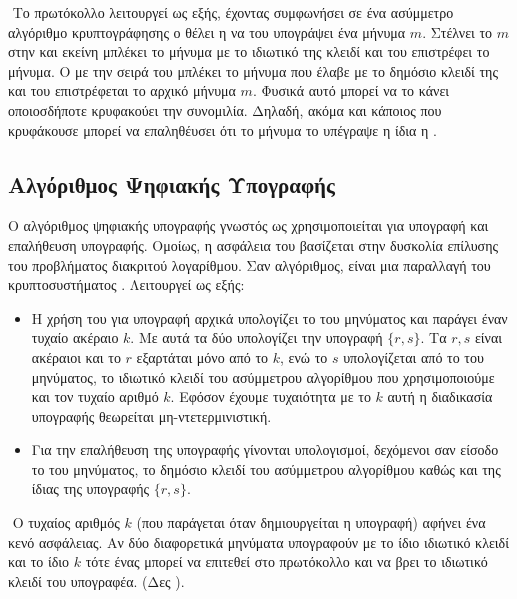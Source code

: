 \documentclass[oneside,a4paper]{article}
\begin{document}
$ $\newline
Το πρωτόκολλο λειτουργεί ως εξής, έχοντας συμφωνήσει σε ένα ασύμμετρο αλγόριθμο κρυπτογράφησης ο  θέλει η  να του υπογράψει ένα μήνυμα $m$. Στέλνει το $m$ στην  και εκείνη μπλέκει το μήνυμα με το ιδιωτικό της κλειδί και του επιστρέφει το μήνυμα. Ο  με την σειρά του μπλέκει το μήνυμα που έλαβε με το δημόσιο κλειδί της  και του επιστρέφεται το αρχικό μήνυμα $m$. Φυσικά αυτό μπορεί να το κάνει οποιοσδήποτε κρυφακούει την συνομιλία. Δηλαδή, ακόμα και κάποιος που κρυφάκουσε μπορεί να επαληθέυσει ότι το μήνυμα το υπέγραψε η ίδια η .

\subsection{Αλγόριθμος Ψηφιακής Υπογραφής}

\vspace*{0.3cm}
Ο αλγόριθμος ψηφιακής υπογραφής γνωστός ως  χρησιμοποιείται για υπογραφή και επαλήθευση υπογραφής. Ομοίως, η ασφάλεια του βασίζεται στην δυσκολία επίλυσης του προβλήματος διακριτού λογαρίθμου. Σαν αλγόριθμος, είναι μια παραλλαγή του κρυπτοσυστήματος . Λειτουργεί ως εξής:

\begin{itemize}
	\item Η χρήση του  για υπογραφή αρχικά υπολογίζει το  του μηνύματος και παράγει έναν τυχαίο ακέραιο $k$. Με αυτά τα δύο υπολογίζει την υπογραφή $\{r,s\}$. Τα $r,s$ είναι ακέραιοι και το $r$ εξαρτάται μόνο από το $k$, ενώ το $s$ υπολογίζεται από το  του μηνύματος, το ιδιωτικό κλειδί του ασύμμετρου αλγορίθμου που χρησιμοποιούμε και τον τυχαίο αριθμό $k$. Εφόσον έχουμε τυχαιότητα με το $k$ αυτή η διαδικασία υπογραφής θεωρείται μη-ντετερμινιστική.
	\item Για την επαλήθευση της υπογραφής γίνονται υπολογισμοί, δεχόμενοι σαν είσοδο το  του μηνύματος, το δημόσιο κλειδί του ασύμμετρου αλγορίθμου καθώς και της ίδιας της υπογραφής $\{r,s\}$.
\end{itemize}

$ $\newline
Ο τυχαίος αριθμός $k$ (που παράγεται όταν δημιουργείται η υπογραφή) αφήνει ένα κενό ασφάλειας. Αν δύο διαφορετικά μηνύματα υπογραφούν με το ίδιο ιδιωτικό κλειδί και το ίδιο $k$ τότε ένας μπορεί να επιτεθεί στο πρωτόκολλο και να βρει το ιδιωτικό κλειδί του υπογραφέα. (Δες ).
\end{document}
